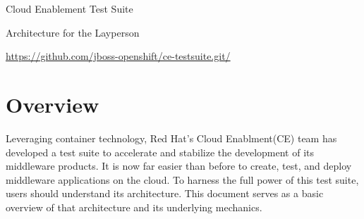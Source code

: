 \documentclass{article}
\begin{document}
\centerline{\sc \large Cloud Enablement Test Suite}
\centerline{\sc Architecture for the Layperson }
\centerline{\url{https://github.com/jboss-openshift/ce-testsuite.git/}}

\vspace{1pc}
\section{Overview}

\hspace{3pc} Leveraging container technology, Red Hat's Cloud Enablment(CE) team has developed a test suite to accelerate and stabilize the development of its middleware products. It is now far easier than before to create, test, and deploy middleware applications on the cloud. To harness the full power of this test suite, users should understand its architecture. This document serves as a basic overview of that architecture and its underlying mechanics.
\end{document}
